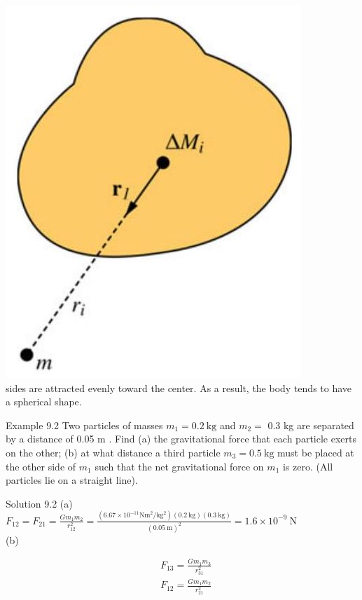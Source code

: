 \documentclass[10pt]{article}
\begin{document}
\includegraphics[max width=\textwidth, center]{2024_09_13_db1f357d2aad0a03eb2eg-146}\\
sides are attracted evenly toward the center. As a result, the body tends to have a spherical shape.

Example 9.2 Two particles of masses $m_{1}=0.2 \mathrm{~kg}$ and $m_{2}=$ 0.3 kg are separated by a distance of 0.05 m . Find (a) the gravitational force that each particle exerts on the other; (b) at what distance a third particle $m_{3}=0.5 \mathrm{~kg}$ must be placed at the other side of $m_{1}$ such that the net gravitational force on $m_{1}$ is zero. (All particles lie on a straight line).

Solution 9.2 (a)\\
$F_{12}=F_{21}=\frac{G m_{1} m_{2}}{r_{12}^{2}}=\frac{\left(6.67 \times 10^{-11} \mathrm{Nm}^{2} / \mathrm{kg}^{2}\right)(0.2 \mathrm{~kg})(0.3 \mathrm{~kg})}{(0.05 \mathrm{~m})^{2}}=1.6 \times 10^{-9} \mathrm{~N}$\\
(b)

$$
\begin{aligned}
& F_{13}=\frac{G m_{1} m_{3}}{r_{31}^{2}} \\
& F_{12}=\frac{G m_{1} m_{2}}{r_{21}^{2}}
\end{aligned}
$$
\end{document}
